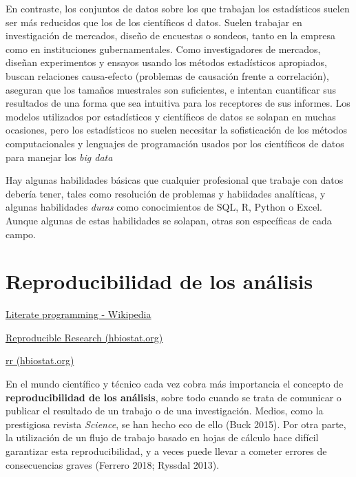 \documentclass[
  letterpaper,
]{scrbook}
\begin{document}
En contraste, los conjuntos de datos sobre los que trabajan los
estadísticos suelen ser más reducidos que los de los científicos d
datos. Suelen trabajar en investigación de mercados, diseño de encuestas
o sondeos, tanto en la empresa como en instituciones gubernamentales.
Como investigadores de mercados, diseñan experimentos y ensayos usando
los métodos estadísticos apropiados, buscan relaciones causa-efecto
(problemas de causación frente a correlación), aseguran que los tamaños
muestrales son suficientes, e intentan cuantificar sus resultados de una
forma que sea intuitiva para los receptores de sus informes. Los modelos
utilizados por estadísticos y científicos de datos se solapan en muchas
ocasiones, pero los estadísticos no suelen necesitar la sofisticación de
los métodos computacionales y lenguajes de programación usados por los
científicos de datos para manejar los \emph{big data}

Hay algunas habilidades básicas que cualquier profesional que trabaje
con datos debería tener, tales como resolución de problemas y habiidades
analíticas, y algunas habilidades \emph{duras} como conocimientos de
SQL, R, Python o Excel. Aunque algunas de estas habilidades se solapan,
otras son específicas de cada campo.

\hypertarget{reproducibilidad-de-los-anuxe1lisis}{%
\section{Reproducibilidad de los
análisis}\label{reproducibilidad-de-los-anuxe1lisis}}

\href{https://en.wikipedia.org/wiki/Literate_programming}{Literate
programming - Wikipedia}

\href{https://hbiostat.org/rr/\#reproducible-research-bbr-chapter-21}{Reproducible
Research (hbiostat.org)}

\href{https://hbiostat.org/rr/\#reproducible-research-bbr-chapter-21}{rr
(hbiostat.org)}

En el mundo científico y técnico cada vez cobra más importancia el
concepto de \textbf{reproducibilidad de los análisis}, sobre todo cuando
se trata de comunicar o publicar el resultado de un trabajo o de una
investigación. Medios, como la prestigiosa revista \emph{Science}, se
han hecho eco de ello (Buck 2015). Por otra parte, la utilización de un
flujo de trabajo basado en hojas de cálculo hace difícil garantizar esta
reproducibilidad, y a veces puede llevar a cometer errores de
consecuencias graves (Ferrero 2018; Ryssdal 2013).
\end{document}
